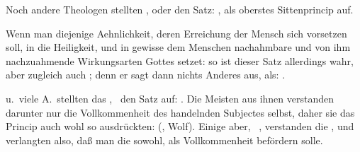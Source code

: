 \begin{aufza}\setcounter{enumi}{12}
\item Noch andere Theologen stellten , oder den Satz: , als oberstes Sittenprincip auf.
\end{aufza}\par
Wenn man diejenige Aehnlichkeit, deren Erreichung der Mensch sich vorsetzen soll, in die Heiligkeit, und in gewisse dem Menschen nachahmbare und von ihm nachzuahmende Wirkungsarten Gottes setzet: so ist dieser Satz allerdings wahr, aber zugleich auch ; denn er sagt dann nichts Anderes aus, als: .
\begin{aufza}\setcounter{enumi}{13}
\item {} u.~viele A.~stellten das , \dh\ den Satz auf: . Die Meisten aus ihnen verstanden darunter nur die Vollkommenheit des handelnden Subjectes selbst, daher sie das Princip auch wohl so ausdrückten:  (, Wolf). Einige aber, \zB\ , verstanden die , und verlangten also, daß man die  sowohl, als  Vollkommenheit befördern solle.\end{aufza}\par
